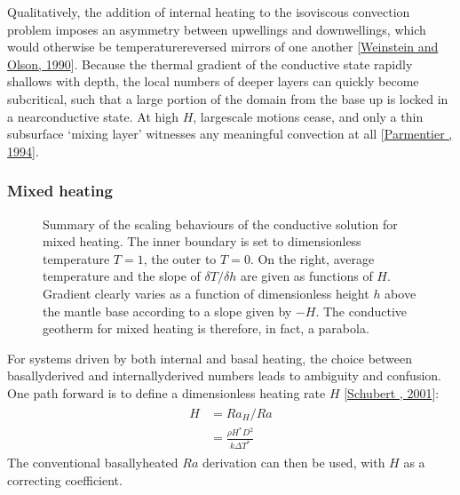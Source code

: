 \documentclass[letterpaper,10pt,english]{jupyterBook}
\begin{document}
\sphinxAtStartPar
Qualitatively, the addition of internal heating to the isoviscous convection problem imposes an asymmetry between upwellings and downwellings, which would otherwise be temperature\sphinxhyphen{}reversed mirrors of one another {[}\hyperlink{cite.references:id813}{Weinstein and Olson, 1990}{]}. Because the thermal gradient of the conductive state rapidly shallows with depth, the local  numbers of deeper layers can quickly become subcritical, such that a large portion of the domain from the base up is locked in a near\sphinxhyphen{}conductive state. At high \(H\), large\sphinxhyphen{}scale motions cease, and only a thin sub\sphinxhyphen{}surface ‘mixing layer’ witnesses any meaningful convection at all {[}\hyperlink{cite.references:id923}{Parmentier , 1994}{]}.


\subsubsection{Mixed heating}
\label{\detokenize{content/chapter_04_isoviscous/background/heating:mixed-heating}}
\begin{figure}[htbp]
\centering
\capstart

\noindent{}
\caption{Summary of the scaling behaviours of the conductive solution for mixed heating. The inner boundary is set to dimensionless temperature \(T=1\), the outer to \(T=0\). On the right, average temperature and the slope of \(\delta T / \delta h\) are given as functions of \(H\). Gradient clearly varies as a function of dimensionless height \(h\) above the mantle base according to a slope given by \(-H\). The conductive geotherm for mixed heating is therefore, in fact, a parabola.}\label{\detokenize{content/chapter_04_isoviscous/background/heating:isocondhmixed}}\end{figure}

\sphinxAtStartPar
For systems driven by both internal and basal heating, the choice between basally\sphinxhyphen{}derived and internally\sphinxhyphen{}derived  numbers leads to ambiguity and confusion. One path forward is to define a dimensionless heating rate \(H\) {[}\hyperlink{cite.references:id663}{Schubert , 2001}{]}:
\begin{equation*}
\begin{split} \begin{align*}
H &= {Ra}_H / Ra \\
&= \frac{\rho H^{*} D^2}{k {\Delta T}^{*}}
\end{align*} \end{split}
\end{equation*}
\sphinxAtStartPar
The conventional basally\sphinxhyphen{}heated \(Ra\) derivation can then be used, with \(H\) as a correcting coefficient.
\end{document}
